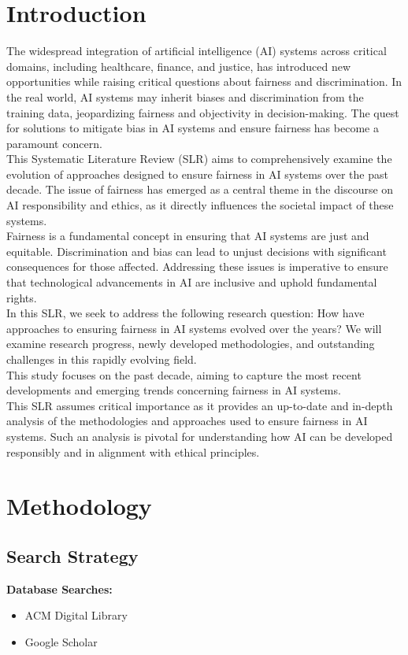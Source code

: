 \documentclass{article}
\begin{document}
\section{Introduction}
The widespread integration of artificial intelligence (AI) systems across critical domains, including healthcare, finance, and justice, has introduced new opportunities while raising critical questions about fairness and discrimination. In the real world, AI systems may inherit biases and discrimination from the training data, jeopardizing fairness and objectivity in decision-making. The quest for solutions to mitigate bias in AI systems and ensure fairness has become a paramount concern. \\
This Systematic Literature Review (SLR) aims to comprehensively examine the evolution of approaches designed to ensure fairness in AI systems over the past decade. The issue of fairness has emerged as a central theme in the discourse on AI responsibility and ethics, as it directly influences the societal impact of these systems. \\
Fairness is a fundamental concept in ensuring that AI systems are just and equitable. Discrimination and bias can lead to unjust decisions with significant consequences for those affected. Addressing these issues is imperative to ensure that technological advancements in AI are inclusive and uphold fundamental rights. \\
In this SLR, we seek to address the following research question: How have approaches to ensuring fairness in AI systems evolved over the years? We will examine research progress, newly developed methodologies, and outstanding challenges in this rapidly evolving field. \\
This study focuses on the past decade, aiming to capture the most recent developments and emerging trends concerning fairness in AI systems. \\
This SLR assumes critical importance as it provides an up-to-date and in-depth analysis of the methodologies and approaches used to ensure fairness in AI systems. Such an analysis is pivotal for understanding how AI can be developed responsibly and in alignment with ethical principles.

\section{Methodology}
    \subsection{Search Strategy}
    \textbf{Database Searches:}
\begin{itemize}
    \item ACM Digital Library
    \item Google Scholar
\end{itemize}
\end{document}
